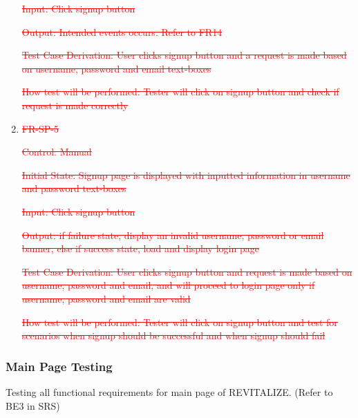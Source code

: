 \documentclass[12pt, titlepage]{article}
\begin{document}
\begin{enumerate}
\textcolor{red}{\sout{Input: Click signup button}}

\textcolor{red}{\sout{Output: Intended events occurs. Refer to FR14}}

\textcolor{red}{\sout{Test Case Derivation: User clicks signup button and a request is made based on username, password and email text-boxes}}

\textcolor{red}{\sout{How test will be performed: Tester will click on signup button and check if request is made correctly}}

\item{\textcolor{red}{\sout{FR-SP-5}}\\}

\textcolor{red}{\sout{Control: Manual}}

\textcolor{red}{\sout{Initial State: Signup page is displayed with inputted information in username and password text-boxes}}

\textcolor{red}{\sout{Input: Click signup button}}

\textcolor{red}{\sout{Output: if failure state, display an invalid username, password or email banner, else if success state, load and display login page}}

\textcolor{red}{\sout{Test Case Derivation: User clicks signup button and request is made based on username, password and email, and will proceed to login page only if username, password and email are valid}}

\textcolor{red}{\sout{How test will be performed: Tester will click on signup button and test for scenarios when signup should be successful and when signup should fail}}

\end{enumerate}

\subsubsection{Main Page Testing}

Testing all functional requirements for main page of REVITALIZE. (Refer to BE3 in SRS)
\end{document}
